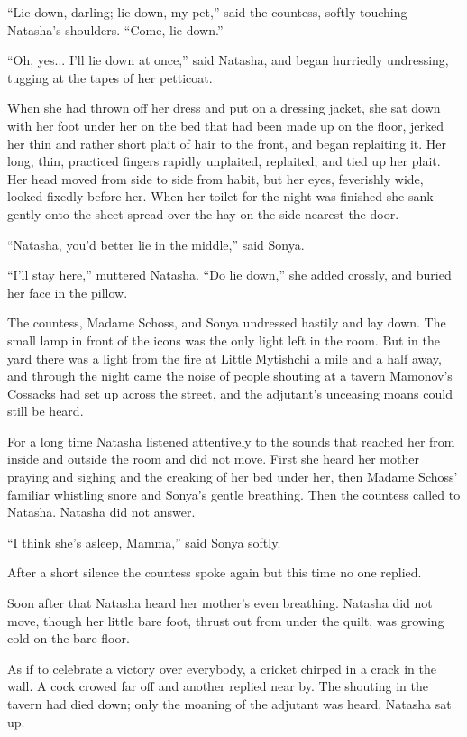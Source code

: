 ``Lie down, darling; lie down, my pet,'' said the countess,
softly touching Natasha's shoulders. ``Come, lie down.''

``Oh, yes... I'll lie down at once,'' said Natasha, and began
hurriedly undressing, tugging at the tapes of her petticoat.

When she had thrown off her dress and put on a dressing jacket,
she sat down with her foot under her on the bed that had been
made up on the floor, jerked her thin and rather short plait of
hair to the front, and began replaiting it. Her long, thin,
practiced fingers rapidly unplaited, replaited, and tied up her
plait. Her head moved from side to side from habit, but her eyes,
feverishly wide, looked fixedly before her. When her toilet for
the night was finished she sank gently onto the sheet spread over
the hay on the side nearest the door.

``Natasha, you'd better lie in the middle,'' said Sonya.

``I'll stay here,'' muttered Natasha. ``Do lie down,'' she added
crossly, and buried her face in the pillow.

The countess, Madame Schoss, and Sonya undressed hastily and lay
down.  The small lamp in front of the icons was the only light
left in the room. But in the yard there was a light from the fire
at Little Mytishchi a mile and a half away, and through the night
came the noise of people shouting at a tavern Mamonov's Cossacks
had set up across the street, and the adjutant's unceasing moans
could still be heard.

For a long time Natasha listened attentively to the sounds that
reached her from inside and outside the room and did not
move. First she heard her mother praying and sighing and the
creaking of her bed under her, then Madame Schoss' familiar
whistling snore and Sonya's gentle breathing. Then the countess
called to Natasha. Natasha did not answer.

``I think she's asleep, Mamma,'' said Sonya softly.

After a short silence the countess spoke again but this time no
one replied.

Soon after that Natasha heard her mother's even
breathing. Natasha did not move, though her little bare foot,
thrust out from under the quilt, was growing cold on the bare
floor.

As if to celebrate a victory over everybody, a cricket chirped in
a crack in the wall. A cock crowed far off and another replied
near by.  The shouting in the tavern had died down; only the
moaning of the adjutant was heard. Natasha sat up.

